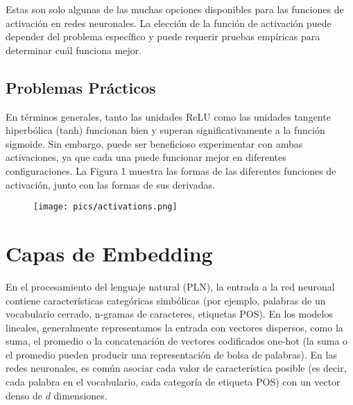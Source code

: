 
Estas son solo algunas de las muchas opciones disponibles para las funciones de activación en redes neuronales. La elección de la función de activación puede depender del problema específico y puede requerir pruebas empíricas para determinar cuál funciona mejor.



\subsection{Problemas Prácticos}
En términos generales, tanto las unidades ReLU como las unidades tangente hiperbólica (tanh) funcionan bien y superan significativamente a la función sigmoide. Sin embargo, puede ser beneficioso experimentar con ambas activaciones, ya que cada una puede funcionar mejor en diferentes configuraciones. La Figura 1 muestra las formas de las diferentes funciones de activación, junto con las formas de sus derivadas.

\begin{figure}[htb]
	\centering
	 \texttt{[image: pics/activations.png]}
\end{figure}


\section{Capas de Embedding}
En el procesamiento del lenguaje natural (PLN), la entrada a la red neuronal contiene características categóricas simbólicas (por ejemplo, palabras de un vocabulario cerrado, n-gramas de caracteres, etiquetas POS). En los modelos lineales, generalmente representamos la entrada con vectores dispersos, como la suma, el promedio o la concatenación de vectores codificados one-hot (la suma o el promedio pueden producir una representación de bolsa de palabras). En las redes neuronales, es común asociar cada valor de característica posible (es decir, cada palabra en el vocabulario, cada categoría de etiqueta POS) con un vector denso de $d$ dimensiones.

